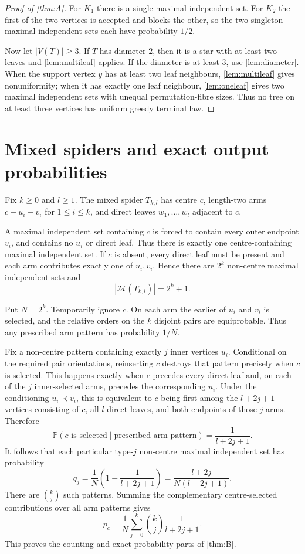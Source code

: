 \documentclass[11pt]{article}
\theoremstyle{definition}
\newcommand{\M}{\mathcal{M}}
\newcommand{\Prob}{\mathbb{P}}
\begin{document}
\begin{proof}[Proof of \cref{thm:A}]
For $K_1$ there is a single maximal independent set.  For $K_2$ the first of the two vertices is accepted and blocks the other, so the two singleton maximal independent sets each have probability $1/2$.

Now let $|V(T)|\ge3$.  If $T$ has diameter $2$, then it is a star with at least two leaves and \cref{lem:multileaf} applies.  If the diameter is at least $3$, use \cref{lem:diameter}.  When the support vertex $y$ has at least two leaf neighbours, \cref{lem:multileaf} gives nonuniformity; when it has exactly one leaf neighbour, \cref{lem:oneleaf} gives two maximal independent sets with unequal permutation-fibre sizes.  Thus no tree on at least three vertices has uniform greedy terminal law.
\end{proof}

\section{Mixed spiders and exact output probabilities}\label{sec:spider}

Fix $k\ge0$ and $l\ge1$.  The mixed spider $T_{k,l}$ has centre $c$, length-two arms $c-u_i-v_i$ for $1\le i\le k$, and direct leaves $w_1,\dots,w_l$ adjacent to $c$.

A maximal independent set containing $c$ is forced to contain every outer endpoint $v_i$, and contains no $u_i$ or direct leaf.  Thus there is exactly one centre-containing maximal independent set.  If $c$ is absent, every direct leaf must be present and each arm contributes exactly one of $u_i,v_i$.  Hence there are $2^k$ non-centre maximal independent sets and
\[
 |\M(T_{k,l})|=2^k+1.
\]

Put $N=2^k$.  Temporarily ignore $c$.  On each arm the earlier of $u_i$ and $v_i$ is selected, and the relative orders on the $k$ disjoint pairs are equiprobable.  Thus any prescribed arm pattern has probability $1/N$.

Fix a non-centre pattern containing exactly $j$ inner vertices $u_i$.  Conditional on the required pair orientations, reinserting $c$ destroys that pattern precisely when $c$ is selected.  This happens exactly when $c$ precedes every direct leaf and, on each of the $j$ inner-selected arms, precedes the corresponding $u_i$.  Under the conditioning $u_i\prec v_i$, this is equivalent to $c$ being first among the $l+2j+1$ vertices consisting of $c$, all $l$ direct leaves, and both endpoints of those $j$ arms.  Therefore
\[
 \Prob(c\text{ is selected}\mid\text{prescribed arm pattern})
 =\frac1{l+2j+1}.
\]
It follows that each particular type-$j$ non-centre maximal independent set has probability
\begin{equation}\label{eq:qj}
 q_j=\frac1N\left(1-\frac1{l+2j+1}\right)
 =\frac{l+2j}{N(l+2j+1)}.
\end{equation}
There are $\binom{k}{j}$ such patterns.  Summing the complementary centre-selected contributions over all arm patterns gives
\begin{equation}\label{eq:pc}
 p_c=\frac1N\sum_{j=0}^k\binom{k}{j}\frac1{l+2j+1}.
\end{equation}
This proves the counting and exact-probability parts of \cref{thm:B}.
\end{document}
